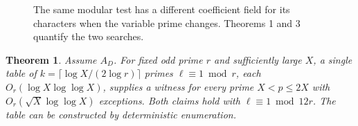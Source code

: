\documentclass[11pt]{article}
\newtheorem{theorem}{Theorem}
\newcommand{\Q}{\mathbb Q}
\begin{document}
\begin{figure}[h]
\centering
{}
\caption{The same modular test has a different coefficient field for its characters when the variable prime changes. Theorems 1 and 3 quantify the two searches.}
\end{figure}

\begin{theorem}\label{average}
Assume $A_D$. For fixed odd prime $r$ and sufficiently large $X$, a single table of
$k=\lceil\log X/(2\log r)\rceil$ primes $\ell\equiv1\bmod r$, each
$O_r(\log X\log\log X)$, supplies a witness for every prime $X<p\le 2X$
with $O_r(\sqrt X\log\log X)$ exceptions. Both claims hold with
$\ell\equiv1\bmod 12r$. The table can be constructed by deterministic enumeration.
\end{theorem}
\end{document}
